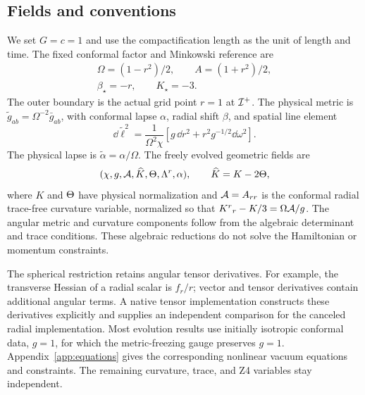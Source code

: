 \subsection{Fields and conventions}
We set $G=c=1$ and use the compactification length as the unit of length and time. The fixed conformal factor and Minkowski reference are
\begin{equation}
 \begin{gathered}
 \Omega=(1-r^2)/2,\qquad A=(1+r^2)/2,\\
 \beta_\star=-r,\qquad K_\star=-3.
 \end{gathered}
\label{eq:reference}
\end{equation}
The outer boundary is the actual grid point $r=1$ at $\mathcal I^+$. The physical metric is $\widetilde g_{ab}=\Omega^{-2}\bar g_{ab}$, with conformal lapse $\alpha$, radial shift $\beta$, and spatial line element
\begin{equation}
 \dd\widetilde\ell^2=\frac{1}{\Omega^2\chi}
 \left[g\,\dd r^2+r^2g^{-1/2}\dd\omega^2\right].
\label{eq:metric}
\end{equation}
The physical lapse is $\widetilde\alpha=\alpha/\Omega$. The freely evolved geometric fields are
\begin{equation}
 (\chi,g,\mathcal A,\widehat K,\Theta,\Lambda^r,\alpha),\qquad
 \widehat K=K-2\Theta,
\end{equation}
where $K$ and $\Theta$ have physical normalization and $\mathcal A=A_{rr}$ is the conformal radial trace-free curvature variable, normalized so that $K^r{}_r-K/3=\Omega\mathcal A/g$. The angular metric and curvature components follow from the algebraic determinant and trace conditions. These algebraic reductions do not solve the Hamiltonian or momentum constraints.

The spherical restriction retains angular tensor derivatives. For example, the transverse Hessian of a radial scalar is $f_r/r$; vector and tensor derivatives contain additional angular terms. A native tensor implementation constructs these derivatives explicitly and supplies an independent comparison for the canceled radial implementation. Most evolution results use initially isotropic conformal data, $g=1$, for which the metric-freezing gauge preserves $g=1$. Appendix~\ref{app:equations} gives the corresponding nonlinear vacuum equations and constraints. The remaining curvature, trace, and Z4 variables stay independent.

